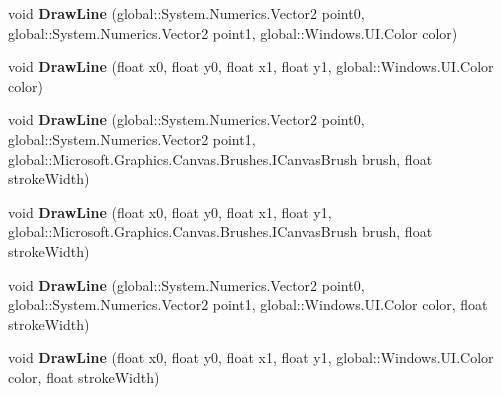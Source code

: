 \begin{DoxyCompactItemize}
\mbox{\label{interface_microsoft_1_1_graphics_1_1_canvas_1_1_i_canvas_drawing_session_a1c018d3317970310c6e9cdb533cae0c6}} 
void {\bfseries Draw\+Line} (global\+::\+System.\+Numerics.\+Vector2 point0, global\+::\+System.\+Numerics.\+Vector2 point1, global\+::\+Windows.\+U\+I.\+Color color)
\item 
\mbox{\label{interface_microsoft_1_1_graphics_1_1_canvas_1_1_i_canvas_drawing_session_a0c0cbe814b2c9574addc8f75b90e3cdf}} 
void {\bfseries Draw\+Line} (float x0, float y0, float x1, float y1, global\+::\+Windows.\+U\+I.\+Color color)
\item 
\mbox{\label{interface_microsoft_1_1_graphics_1_1_canvas_1_1_i_canvas_drawing_session_a9abdb1e2da9c7671f75ce437d7bcba48}} 
void {\bfseries Draw\+Line} (global\+::\+System.\+Numerics.\+Vector2 point0, global\+::\+System.\+Numerics.\+Vector2 point1, global\+::\+Microsoft.\+Graphics.\+Canvas.\+Brushes.\+I\+Canvas\+Brush brush, float stroke\+Width)
\item 
\mbox{\label{interface_microsoft_1_1_graphics_1_1_canvas_1_1_i_canvas_drawing_session_a29b60d9da085ea054a4384b079481a46}} 
void {\bfseries Draw\+Line} (float x0, float y0, float x1, float y1, global\+::\+Microsoft.\+Graphics.\+Canvas.\+Brushes.\+I\+Canvas\+Brush brush, float stroke\+Width)
\item 
\mbox{\label{interface_microsoft_1_1_graphics_1_1_canvas_1_1_i_canvas_drawing_session_a1fb8e14a555b12cee02481b049136a39}} 
void {\bfseries Draw\+Line} (global\+::\+System.\+Numerics.\+Vector2 point0, global\+::\+System.\+Numerics.\+Vector2 point1, global\+::\+Windows.\+U\+I.\+Color color, float stroke\+Width)
\item 
\mbox{\label{interface_microsoft_1_1_graphics_1_1_canvas_1_1_i_canvas_drawing_session_a6444612b873b32ed2cf5e81d5275c96e}} 
void {\bfseries Draw\+Line} (float x0, float y0, float x1, float y1, global\+::\+Windows.\+U\+I.\+Color color, float stroke\+Width)

\end{DoxyCompactItemize}
